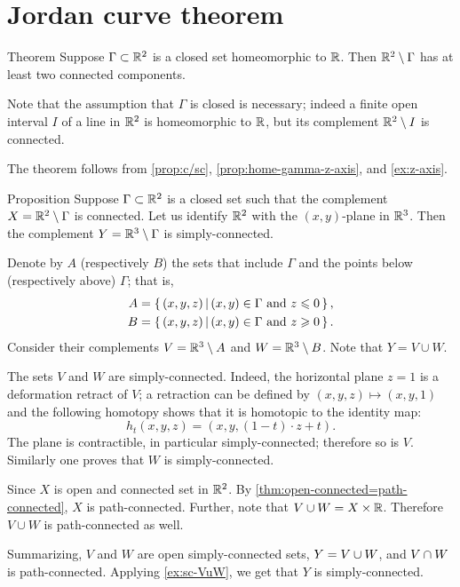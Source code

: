 \chapter{Jordan curve theorem}

\begin{thm}{Theorem}\label{thm:proper-jordan}
Suppose $\Gamma\subset\mathbb{R}^2$ is a closed set homeomorphic to $\mathbb{R}$.
Then $\mathbb{R}^2\setminus \Gamma$ has at least two connected components.
\end{thm}

Note that the assumption that $\Gamma$ is closed is necessary;
indeed a finite open interval $I$ of a line in $\mathbb{R}^2$ is homeomorphic to $\mathbb{R}$, but its complement $\mathbb{R}^2\setminus I$ is connected.

The theorem follows from \ref{prop:c/sc}, \ref{prop:home-gamma-z-axis}, and \ref{ex:z-axis}.

\begin{thm}{Proposition}\label{prop:c/sc}
Suppose $\Gamma\subset\mathbb{R}^2$ is a closed set such that the complement $X=\mathbb{R}^2\setminus \Gamma$ is connected.
Let us identify $\mathbb{R}^2$ with the $(x,y)$-plane in $\mathbb{R}^3$.
Then the complement $Y=\mathbb{R}^3\setminus \Gamma$ is simply-connected.
\end{thm}


Denote by $A$ (respectively $B$) the sets that include $\Gamma$ and the points below (respectively above) $\Gamma$;
that is,
\begin{align*}
A&=\left\{\,{(x,y,z)}\,\middle|\,{(x,y)\in\Gamma\ \text{and}\ z\leqslant 0}\,\right\},
\\
B&=\left\{\,{(x,y,z)}\,\middle|\,{(x,y)\in\Gamma\ \text{and}\ z\geqslant 0}\,\right\}.
\end{align*}
Consider their complements $V=\mathbb{R}^3\setminus A$ and $W=\mathbb{R}^3\setminus B$.
Note that $Y=V\cup W$.

The sets $V$ and $W$ are simply-connected.
Indeed, the horizontal plane $z= 1$ is a deformation retract of $V$;
a retraction can be defined by $(x,y,z)\mapsto (x,y,1)$ and the following homotopy shows that it is homotopic to the identity map: 
\[h_t(x,y,z)=(x,y,(1-t)\cdot z+t).\]
The plane is contractible, in particular simply-connected; therefore so is $V$.
Similarly one proves that $W$ is simply-connected.


Since $X$ is open and connected set in $\mathbb{R}^2$.
By \ref{thm:open-connected=path-connected}, $X$ is path-connected.
Further, note that $V\cup W=X\times \mathbb{R}$.
Therefore $V\cup W$ is path-connected as well.

Summarizing, $V$ and $W$ are open simply-connected sets, $Y=V\z\cup W$, and $V\z\cap W$ is path-connected.
Applying \ref{ex:sc-VuW}, we get that $Y$ is simply-connected.
\qeds

